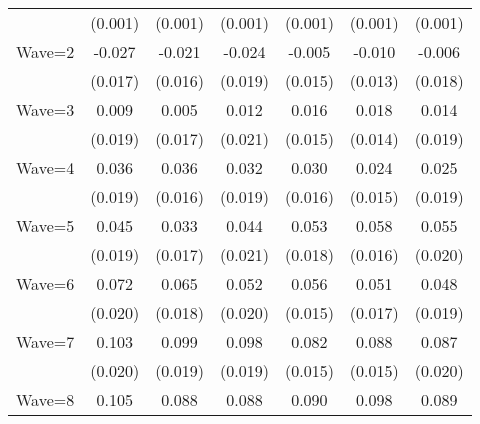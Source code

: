 {\begin{tabular}{l*{6}{c}}
                    &     (0.001)         &     (0.001)         &     (0.001)         &     (0.001)         &     (0.001)         &     (0.001)         \\
Wave=2              &      -0.027         &      -0.021         &      -0.024         &      -0.005         &      -0.010         &      -0.006         \\
                    &     (0.017)         &     (0.016)         &     (0.019)         &     (0.015)         &     (0.013)         &     (0.018)         \\
Wave=3              &       0.009         &       0.005         &       0.012         &       0.016         &       0.018         &       0.014         \\
                    &     (0.019)         &     (0.017)         &     (0.021)         &     (0.015)         &     (0.014)         &     (0.019)         \\
Wave=4              &       0.036\sym{*}  &       0.036\sym{**} &       0.032\sym{*}  &       0.030\sym{*}  &       0.024\sym{*}  &       0.025         \\
                    &     (0.019)         &     (0.016)         &     (0.019)         &     (0.016)         &     (0.015)         &     (0.019)         \\
Wave=5              &       0.045\sym{**} &       0.033\sym{*}  &       0.044\sym{**} &       0.053\sym{***}&       0.058\sym{***}&       0.055\sym{***}\\
                    &     (0.019)         &     (0.017)         &     (0.021)         &     (0.018)         &     (0.016)         &     (0.020)         \\
Wave=6              &       0.072\sym{***}&       0.065\sym{***}&       0.052\sym{**} &       0.056\sym{***}&       0.051\sym{***}&       0.048\sym{***}\\
                    &     (0.020)         &     (0.018)         &     (0.020)         &     (0.015)         &     (0.017)         &     (0.019)         \\
Wave=7              &       0.103\sym{***}&       0.099\sym{***}&       0.098\sym{***}&       0.082\sym{***}&       0.088\sym{***}&       0.087\sym{***}\\
                    &     (0.020)         &     (0.019)         &     (0.019)         &     (0.015)         &     (0.015)         &     (0.020)         \\
Wave=8              &       0.105\sym{***}&       0.088\sym{***}&       0.088\sym{***}&       0.090\sym{***}&       0.098\sym{***}&       0.089\sym{***}\\

\end{tabular}}
